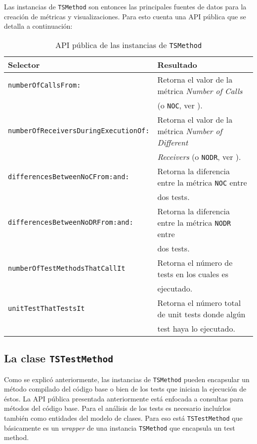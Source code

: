 \par Las instancias de {\tt TSMethod} son entonces las principales fuentes de datos para la creación de métricas y visualizaciones. Para esto cuenta una API pública que se detalla a continuación:  

\begin{table}[h] 
    \centering 
    \begin{tabular}{|l|l|}
    	\hline
\textbf{Selector} & \textbf{Resultado} \\ \hline \hline

{\tt numberOfCallsFrom: } & Retorna el valor de la métrica \emph{Number of Calls}\\
						& (o {\tt NOC}, ver \secref{viz-metricas}). \\ \hline
{\tt numberOfReceiversDuringExecutionOf:} & Retorna el valor de la métrica \emph{Number of Different}  \\ 
						&\emph{Receivers} (o {\tt NODR}, ver \secref{viz-metricas}). \\ \hline
{\tt differencesBetweenNoCFrom:and:}	& Retorna la diferencia entre la métrica {\tt NOC} entre\\
						&  dos tests. \\ \hline
{\tt differencesBetweenNoDRFrom:and:} & Retorna la diferencia entre la métrica {\tt NODR}  entre\\
						&  dos tests. \\ \hline
{\tt numberOfTestMethodsThatCallIt} & Retorna el número de tests en los cuales es  \\ 
						& ejecutado.\\ \hline
{\tt unitTestThatTestsIt} & Retorna el número total de unit tests donde algún  \\ 
						& test haya lo ejecutado. \\ \hline						
    \end{tabular}
    \caption{API pública de las instancias de {\tt TSMethod}}
\end{table} 


\subsection{La clase {\tt TSTestMethod} }
\par Como se explicó anteriormente, las instancias de {\tt TSMethod} pueden encapsular un método compilado del código base o bien de los tests que inician la ejecución de éstos. La API pública presentada anteriormente está enfocada a consultas para métodos del código base. Para el análisis de los tests es necesario incluírlos también como entidades del modelo de clases. Para eso está {\tt TSTestMethod} que básicamente es un \emph{wrapper} de una instancia {\tt TSMethod} que encapsula un test method.


